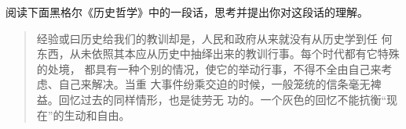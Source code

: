 \documentclass[a3paper, landscape, twocolumn, twoside, zihao = 5,
unicodeGBMath, %
]{ctexart}
\begin{document}

\begin{qus}

\item 阅读下面黑格尔《历史哲学》中的一段话，思考并提出你对这段话的理解。

  \begin{quotation}
    \kaishu 经验或曰历史给我们的教训却是，人民和政府从来就没有从历史学到任
    何东西，从未依照其本应从历史中抽绎出来的教训行事。每个时代都有它特殊的处境，
    都具有一种个别的情况，使它的举动行事，不得不全由自己来考虑、自己来解决。当重
    大事件纷乘交迫的时候，一般笼统的信条毫无裨益。回忆过去的同样情形，也是徒劳无
    功的。一个灰色的回忆不能抗衡``现在''的生动和自由。
  \end{quotation}

\end{qus}
\end{document}
